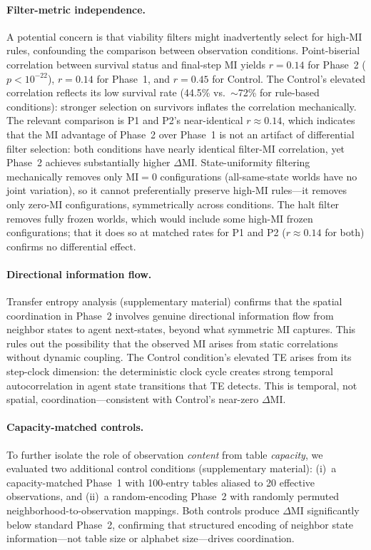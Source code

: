 \documentclass[letterpaper]{article}
\begin{document}
\paragraph{Filter-metric independence.}
A potential concern is that viability filters might inadvertently select for
high-MI rules, confounding the comparison between observation conditions.
Point-biserial correlation between survival status and final-step MI yields
$r = 0.14$ for Phase~2 ($p < 10^{-22}$), $r = 0.14$ for Phase~1, and
$r = 0.45$ for Control. The Control's elevated correlation reflects its
low survival rate (44.5\% vs.\ $\sim$72\% for rule-based conditions):
stronger selection on survivors inflates the correlation mechanically.
The relevant comparison is P1 and P2's near-identical $r \approx 0.14$,
which indicates that the MI advantage of Phase~2 over Phase~1 is not an
artifact of differential filter selection: both conditions have nearly
identical filter-MI correlation, yet Phase~2 achieves substantially higher
$\Delta\mathrm{MI}$. State-uniformity filtering mechanically removes only MI$=0$ configurations (all-same-state worlds have no joint variation), so it cannot preferentially preserve high-MI rules---it removes only zero-MI configurations, symmetrically across conditions. The halt filter removes fully frozen worlds, which would include some high-MI frozen configurations; that it does so at matched rates for P1 and P2 ($r\approx 0.14$ for both) confirms no differential effect.

\paragraph{Directional information flow.}
Transfer entropy analysis (supplementary material) confirms that the spatial
coordination in Phase~2 involves genuine directional information flow from
neighbor states to agent next-states, beyond what symmetric MI captures.
This rules out the possibility that the observed MI arises from static
correlations without dynamic coupling. The Control condition's elevated TE arises from its step-clock dimension: the deterministic clock cycle creates strong temporal autocorrelation in agent state transitions that TE detects. This is temporal, not spatial, coordination---consistent with Control's near-zero $\Delta\mathrm{MI}$.

\paragraph{Capacity-matched controls.}
To further isolate the role of observation \emph{content} from table
\emph{capacity}, we evaluated two additional control conditions
(supplementary material): (i)~a capacity-matched Phase~1 with 100-entry
tables aliased to 20 effective observations, and (ii)~a random-encoding
Phase~2 with randomly permuted neighborhood-to-observation mappings.
Both controls produce $\Delta\mathrm{MI}$ significantly below
standard Phase~2, confirming that structured encoding of neighbor state
information---not table size or alphabet size---drives coordination.
\end{document}
